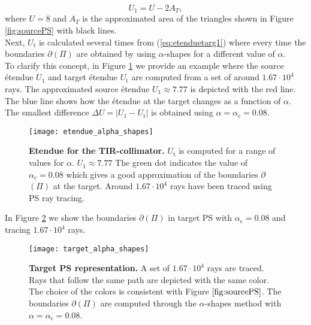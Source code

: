  \begin{equation}\label{eq:Usource}
 U_{1} = U-2A_{T},
 \end{equation}
 where $U=8$ and $A_{T}$ is the approximated area of the triangles shown in Figure \ref{fig:sourcePS} with black lines.\\ \indent  Next, $U_{\textrm{t}}$ is calculated several times from (\ref{eq:etenduetarg1}) where every time the boundaries $\partial$$(\Pi)$ are obtained by using $\alpha$-shapes for a different value of $\alpha$. 
\\ \indent To clarify this concept, in Figure \ref{fig:etendueTS} we provide an example where the source \'{e}tendue $U_1$ and target \'{e}tendue $U_{\textrm{t}}$ are computed from a set of around $1.67\cdot 10^4$ rays. The approximated source \'{e}tendue $U_1\approx 7.77$ is depicted with the red line. The blue line shows how the \'{e}tendue at the target changes as a function of $\alpha$. The smallest difference $\Delta U = |U_1-U_{\textrm{t}}|$ is obtained using $\alpha = \alpha_\textrm{c} = 0.08$.
 \begin{figure}[h]
  \begin{center}
  \texttt{[image: etendue\_alpha\_shapes]}
  \end{center}
  \caption{\textbf{Etendue for the TIR-collimator.} $U_\textrm{t}$ is computed for a range of values for $\alpha$. $U_1 \approx 7.77$
   The green dot indicates the value of $\alpha_\textrm{c} = 0.08$ which gives a good approximation of the boundaries $\partial$$(\Pi)$ at the target.
   Around $1.67 \cdot 10^4$ rays have been traced using PS ray tracing.
  }
  \label{fig:etendueTS}
\end{figure}
In Figure \ref{fig:targetPS} we show the boundaries 
$\partial$$(\Pi)$ in target PS with $\alpha_\textrm{c}=0.08$ and tracing $1.67\cdot10^4$ rays.
  \begin{figure}[h]
  \begin{center}
  \texttt{[image: target\_alpha\_shapes]}
  \end{center}
  \caption{\textbf{Target PS representation.} A set of $1.67 \cdot 10^4$ rays are traced.
  Rays that follow the same path are depicted with the same color. The choice of the colors is consistent with Figure $\ref{fig:sourcePS}$. The boundaries $\partial$$(\Pi)$ are computed through the $\alpha$-shapes method with $\alpha = \alpha_\textrm{c} = 0.08$.}
  \label{fig:targetPS}
\end{figure}
